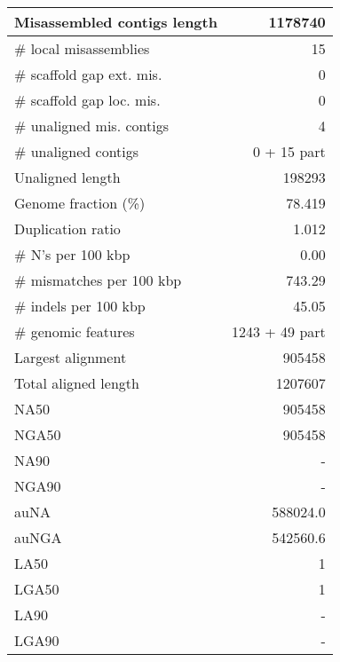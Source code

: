 \documentclass[12pt,a4paper]{article}
\begin{document}
\begin{table}[ht]
\begin{center}
\begin{tabular}{|l*{1}{|r}|}
Misassembled contigs length & 1178740 \\ \hline
\# local misassemblies & 15 \\ \hline
\# scaffold gap ext. mis. & 0 \\ \hline
\# scaffold gap loc. mis. & 0 \\ \hline
\# unaligned mis. contigs & 4 \\ \hline
\# unaligned contigs & 0 + 15 part \\ \hline
Unaligned length & 198293 \\ \hline
Genome fraction (\%) & 78.419 \\ \hline
Duplication ratio & 1.012 \\ \hline
\# N's per 100 kbp & 0.00 \\ \hline
\# mismatches per 100 kbp & 743.29 \\ \hline
\# indels per 100 kbp & 45.05 \\ \hline
\# genomic features & 1243 + 49 part \\ \hline
Largest alignment & 905458 \\ \hline
Total aligned length & 1207607 \\ \hline
NA50 & 905458 \\ \hline
NGA50 & 905458 \\ \hline
NA90 & - \\ \hline
NGA90 & - \\ \hline
auNA & 588024.0 \\ \hline
auNGA & 542560.6 \\ \hline
LA50 & 1 \\ \hline
LGA50 & 1 \\ \hline
LA90 & - \\ \hline
LGA90 & - \\ \hline
\end{tabular}
\end{center}
\end{table}
\end{document}
